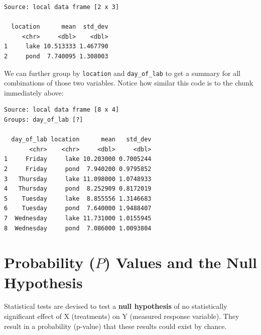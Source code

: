 \documentclass[twoside, 12pt]{article}
\newenvironment{Shaded}{\begin{snugshade}}{\end{snugshade}}
\newcommand{\KeywordTok}[1]{\textcolor[rgb]{0.13,0.29,0.53}{\textbf{{#1}}}}
\newcommand{\DataTypeTok}[1]{\textcolor[rgb]{0.13,0.29,0.53}{{#1}}}
\newcommand{\StringTok}[1]{\textcolor[rgb]{0.31,0.60,0.02}{{#1}}}
\newcommand{\NormalTok}[1]{{#1}}
\begin{document}
\begin{Verbatim}[frame=single]
Source: local data frame [2 x 3]

  location      mean  std_dev
     <chr>     <dbl>    <dbl>
1     lake 10.513333 1.467790
2     pond  7.740095 1.308003
\end{Verbatim}

We can further group by \texttt{location} and \texttt{day\_of\_lab} to
get a summary for all combinations of those two variables. Notice how
similar this code is to the chunk immediately above:

\begin{Shaded}
\end{Shaded}

\begin{Verbatim}[frame=single]
Source: local data frame [8 x 4]
Groups: day_of_lab [?]

  day_of_lab location      mean   std_dev
       <chr>    <chr>     <dbl>     <dbl>
1     Friday     lake 10.203000 0.7005244
2     Friday     pond  7.940200 0.9795852
3   Thursday     lake 11.098000 1.0748933
4   Thursday     pond  8.252909 0.8172019
5    Tuesday     lake  8.855556 1.3146683
6    Tuesday     pond  7.640000 1.9488407
7  Wednesday     lake 11.731000 1.0155945
8  Wednesday     pond  7.086000 1.0093804
\end{Verbatim}

\section{\texorpdfstring{Probability (\(P\)) Values and the Null
Hypothesis}{Probability (P) Values and the Null Hypothesis}}\label{probability-p-values-and-the-null-hypothesis}

Statistical tests are devised to test a \textbf{null hypothesis} of no
statistically significant effect of X (treatments) on Y (measured
response variable). They result in a probability (p-value) that these
results could exist by chance.
\end{document}
